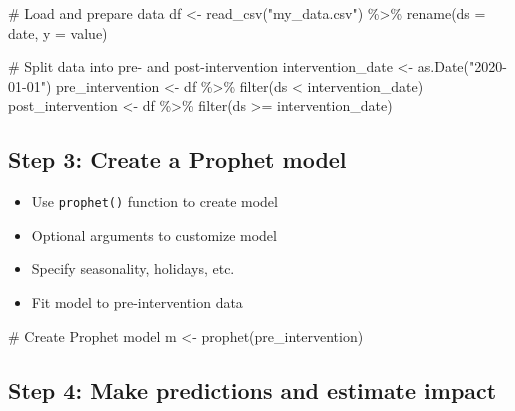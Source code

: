 \documentclass[
  letterpaper,
  DIV=11,
  numbers=noendperiod]{scrartcl}
\newenvironment{Shaded}{\begin{snugshade}}{\end{snugshade}}
\newcommand{\AttributeTok}[1]{\textcolor[rgb]{0.40,0.45,0.13}{#1}}
\newcommand{\CommentTok}[1]{\textcolor[rgb]{0.37,0.37,0.37}{#1}}
\newcommand{\FunctionTok}[1]{\textcolor[rgb]{0.28,0.35,0.67}{#1}}
\newcommand{\NormalTok}[1]{\textcolor[rgb]{0.00,0.23,0.31}{#1}}
\newcommand{\OtherTok}[1]{\textcolor[rgb]{0.00,0.23,0.31}{#1}}
\newcommand{\SpecialCharTok}[1]{\textcolor[rgb]{0.37,0.37,0.37}{#1}}
\newcommand{\StringTok}[1]{\textcolor[rgb]{0.13,0.47,0.30}{#1}}
\providecommand{\tightlist}{%
  \setlength{\itemsep}{0pt}\setlength{\parskip}{0pt}}\usepackage{longtable,booktabs,array}
\begin{document}
\begin{Shaded}
\begin{Highlighting}[]
\CommentTok{\# Load and prepare data}
\NormalTok{df }\OtherTok{\textless{}{-}} \FunctionTok{read\_csv}\NormalTok{(}\StringTok{"my\_data.csv"}\NormalTok{) }\SpecialCharTok{\%\textgreater{}\%}
  \FunctionTok{rename}\NormalTok{(}\AttributeTok{ds =}\NormalTok{ date, }\AttributeTok{y =}\NormalTok{ value)}

\CommentTok{\# Split data into pre{-} and post{-}intervention}
\NormalTok{intervention\_date }\OtherTok{\textless{}{-}} \FunctionTok{as.Date}\NormalTok{(}\StringTok{"2020{-}01{-}01"}\NormalTok{)}
\NormalTok{pre\_intervention }\OtherTok{\textless{}{-}}\NormalTok{ df }\SpecialCharTok{\%\textgreater{}\%} \FunctionTok{filter}\NormalTok{(ds }\SpecialCharTok{\textless{}}\NormalTok{ intervention\_date)}
\NormalTok{post\_intervention }\OtherTok{\textless{}{-}}\NormalTok{ df }\SpecialCharTok{\%\textgreater{}\%} \FunctionTok{filter}\NormalTok{(ds }\SpecialCharTok{\textgreater{}=}\NormalTok{ intervention\_date)}
\end{Highlighting}
\end{Shaded}

\hypertarget{step-3-create-a-prophet-model}{%
\subsection{Step 3: Create a Prophet
model}\label{step-3-create-a-prophet-model}}

\begin{itemize}
\tightlist
\item
  Use \texttt{prophet()} function to create model
\item
  Optional arguments to customize model
\item
  Specify seasonality, holidays, etc.
\item
  Fit model to pre-intervention data
\end{itemize}

\begin{Shaded}
\begin{Highlighting}[]
\CommentTok{\# Create Prophet model}
\NormalTok{m }\OtherTok{\textless{}{-}} \FunctionTok{prophet}\NormalTok{(pre\_intervention)}
\end{Highlighting}
\end{Shaded}

\hypertarget{step-4-make-predictions-and-estimate-impact}{%
\subsection{Step 4: Make predictions and estimate
impact}\label{step-4-make-predictions-and-estimate-impact}}
\end{document}
